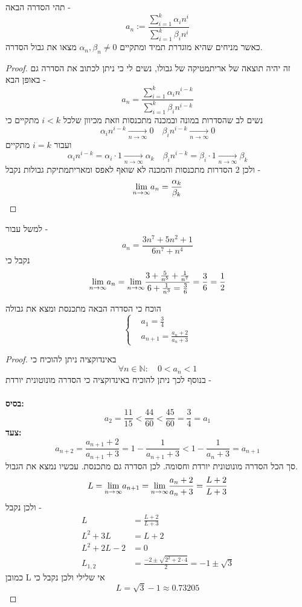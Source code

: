 \documentclass{article}
\begin{document}
\begin{exercise}
תהי הסדרה הבאה - 
\[a_n:=\frac{\sum_{i=1}^k \alpha_in^i}{\sum_{i=1}^k \beta_in^i}\]
כאשר מניחים שהיא מוגדרת תמיד ומתקיים 
$\alpha_n,\beta_n\neq 0$
מצאו את גבול הסדרה.
\end{exercise}
\begin{proof}
זה יהיה תוצאה של אריתמטיקה של גבולו, נשים לי כי ניתן לכתוב את הסדרה גם באופן הבא - 
\[a_n = \frac{\sum_{i=1}^k \alpha_in^{i-k}}{\sum_{i=1}^k \beta_in^{i-k}}\]
נשים לב שהסדרות במונה ובמכנה מתכנסות וזאת מכיוון שלכל 
$i<k$
מתקיים כי 
\[\alpha_i n^{i-k}\underset{n\rightarrow{\infty}}{\longrightarrow} 0 \quad \beta_i n^{i-k}\underset{n\rightarrow{\infty}}{\longrightarrow} 0\]
ועבור 
$i=k$
מתקיים 
\[\alpha_i n^{i-k} = \alpha_i\cdot 1\underset{n\rightarrow{\infty}}{\longrightarrow} \alpha_k \quad \beta_i n^{i-k} = \beta_i \cdot 1\underset{n\rightarrow{\infty}}{\longrightarrow} \beta_k\]
ולכן 2 הסדרות מתכנסות והמכנה לא שואף לאפס ומאריתמתיקת גבולות נקבל - 
\[\underset{n\rightarrow\infty}{\lim} a_n = \frac{\alpha_k}{\beta_k}\]
\end{proof}
\begin{example}
למשל עבור - 
\[a_n = \frac{3n^7+5n^2+1}{6n^7+n^4}\]
נקבל כי 
\[\underset{n\rightarrow\infty}{\lim} a_n = \underset{n\rightarrow\infty}{\lim} \frac{3+\frac{5}{n^5} + \frac{1}{n^7}}{6+\frac{1}{n^3} = \frac{3}{6}} = \frac{3}{6}=\frac{1}{2}\]
\end{example}
\begin{exercise}
הוכח כי הסדרה הבאה מתכנסת ומצא את גבולה 
\[\begin{cases}&a_1=\frac{3}{4} \\ &a_{n+1} = \frac{a_n+2}{a_n+3}\end{cases}\]
\end{exercise}
\begin{proof}
באינדוקציה ניתן להוכיח כי 
\[\forall n\in\mathbb{N}:\quad 0<a_n<1\]
בנוסף לכך ניתן להוכיח באינדוקציה כי הסדרה מונוטונית יורדת - \\\\
\textbf{בסיס:}
\[a_2 = \frac{11}{15}<\frac{44}{60}<\frac{45}{60} = \frac{3}{4}=a_1\]
\textbf{צעד:}
\[a_{n+2} = \frac{a_{n+1}+2}{a_{n+1}+3} = 1-\frac{1}{a_{n+1}+3}<1-\frac{1}{a_n+3}=a_{n+1}\]
סך הכל הסדרה מונוטונית יורדת וחסומה. לכן הסדרה גם מתכנסת. עכשיו נמצא את הגבול. 
\[L=\underset{n\rightarrow\infty}{\lim} a_{n+1} = \underset{n\rightarrow\infty}{\lim} \frac{a_n+2}{a_n+3} = \frac{L+2}{L+3}\]
ולכן נקבל - 
\begin{align*}
	L&=\frac{L+2}{L+3} \\
	L^2+3L &= L+2 \\
	L^2 + 2L - 2 &= 0 \\
	L_{1,2}&=\frac{-2\pm \sqrt{2^2+2\cdot 4}}{2} = -1\pm\sqrt{3}
\end{align*}
כמובן L אי שלילי ולכן נקבל כי
\[L=\sqrt{3}-1\approx 0.73205\]
\end{proof}
\end{document}
